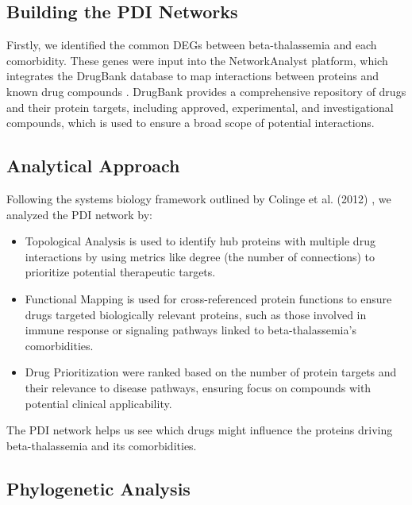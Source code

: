 \subsection*{Building the PDI Networks}

Firstly, we identified the common DEGs between beta-thalassemia and each comorbidity. These genes were input into the NetworkAnalyst platform, which integrates the DrugBank database to map interactions between proteins and known drug compounds \cite{b18}. DrugBank provides a comprehensive repository of drugs and their protein targets, including approved, experimental, and investigational compounds, which is used to ensure a broad scope of potential interactions.

\subsection*{Analytical Approach}

Following the systems biology framework outlined by Colinge et al. (2012) \cite{pdi_colinge}, we analyzed the PDI network by:
\begin{itemize}
    \item Topological Analysis is used to identify hub proteins with multiple drug interactions by using metrics like degree (the number of connections) to prioritize potential therapeutic targets.
    \item Functional Mapping is used for cross-referenced protein functions to ensure drugs targeted biologically relevant proteins, such as those involved in immune response or signaling pathways linked to beta-thalassemia's comorbidities.
    \item Drug Prioritization were ranked based on the number of protein targets and their relevance to disease pathways, ensuring focus on compounds with potential clinical applicability.
\end{itemize}
The PDI network helps us see which drugs might influence the proteins driving beta-thalassemia and its comorbidities.

\vspace*{-\parskip}
\subsection{Phylogenetic Analysis}
\label{sec:phylogenetic}

